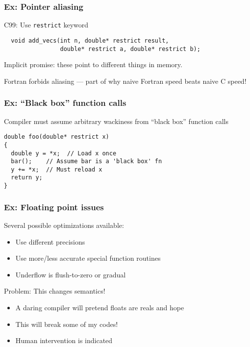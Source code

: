 \documentclass{beamer}
\begin{document}
\begin{frame}[fragile]
  \frametitle{Ex: Pointer aliasing}

  C99: Use {\tt restrict} keyword
  \begin{lstlisting}
  void add_vecs(int n, double* restrict result,
                double* restrict a, double* restrict b);
  \end{lstlisting}
  Implicit promise: these point to different things in memory.

  \vspace{5mm}
  Fortran forbids aliasing --- part of why naive Fortran speed beats
  naive C speed!
\end{frame}



\begin{frame}[fragile]
  \frametitle{Ex: ``Black box'' function calls}

Compiler must assume arbitrary wackiness from ``black box'' function calls
\begin{lstlisting}
double foo(double* restrict x)
{
  double y = *x;  // Load x once
  bar();    // Assume bar is a 'black box' fn
  y += *x;  // Must reload x
  return y;
}
\end{lstlisting}

\end{frame}


\begin{frame}
  \frametitle{Ex: Floating point issues}

  Several possible optimizations available:
  \begin{itemize}
  \item Use different precisions
  \item Use more/less accurate special function routines
  \item Underflow is flush-to-zero or gradual
  \end{itemize}
  Problem: This changes semantics!
  \begin{itemize}
  \item A daring compiler will pretend floats are reals and hope
  \item This will break some of my codes!
  \item Human intervention is indicated
  \end{itemize}
\end{frame}
\end{document}
